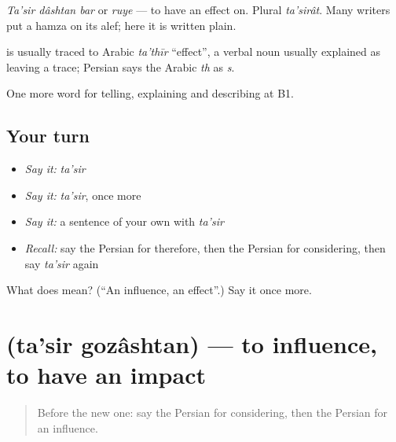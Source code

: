 \emph{Ta'sir dâshtan bar} or \emph{ruye} — to have an effect on. Plural \emph{ta'sirât}. Many writers put a hamza on its alef; here it is written plain.

\begin{cousinweb}
\textbf{} is usually traced to Arabic \emph{ta'thīr} \textquotedblleft{}effect\textquotedblright{}, a verbal noun usually explained as leaving a trace; Persian says the Arabic \emph{th} as \emph{s}.
\end{cousinweb}

\begin{grammarlens}[title={What you've built}]
One more word for telling, explaining and describing at B1.
\end{grammarlens}

\subsection*{Your turn}
\begin{itemize}
\raggedright
  \item \emph{Say it:} \emph{ta'sir}
  \item \emph{Say it:} \emph{ta'sir}, once more
  \item \emph{Say it:} a sentence of your own with \emph{ta'sir}
  \item \emph{Recall:} say the Persian for therefore, then the Persian for considering, then say \emph{ta'sir} again
\end{itemize}

\begin{tcolorbox}[breakable,colback=teal!4,colframe=teal!35!black,title={Before you move on}]
What does  mean? (\textquotedblleft{}An influence, an effect\textquotedblright{}.) Say it once more.
\end{tcolorbox}
\section[\texorpdfstring{\fa{تاثیر} \fa{گذاشتن} (ta'sir gozâshtan)}{تاثیر گذاشتن (ta'sir gozâshtan)}]{  (ta'sir gozâshtan) — to influence, to have an impact}

\label{lesson:FA-C372-tasir-gozashtan}



\begin{quote}
Before the new one: say the Persian for considering, then the Persian for an influence.
\end{quote}

